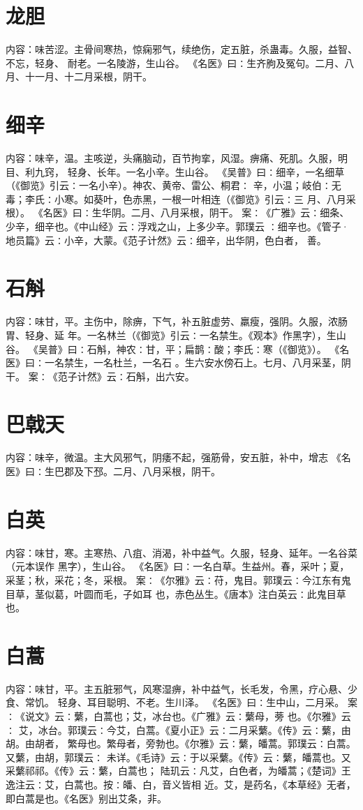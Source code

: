 \documentclass[12pt,UTF8]{ctexbook}
\begin{document}
\section{龙胆}
内容：味苦涩。主骨间寒热，惊痫邪气，续绝伤，定五脏，杀蛊毒。久服，益智、不忘，轻身、 
耐老。一名陵游，生山谷。 
《名医》曰∶生齐朐及冤句。二月、八月、十一月、十二月采根，阴干。 


\section{细辛}
内容：味辛，温。主咳逆，头痛脑动，百节拘挛，风湿。痹痛、死肌。久服，明目、利九窍， 
轻身、长年。一名小辛。生山谷。 
《吴普》曰∶细辛，一名细草（《御览》引云∶一名小辛）。神农、黄帝、雷公、桐君∶ 
辛，小温；岐伯∶无毒；李氏∶小寒。如葵叶，色赤黑，一根一叶相连（《御览》引云∶三 
月、八月采根）。 
《名医》曰∶生华阴。二月、八月采根，阴干。 
案∶《广雅》云∶细条、少辛，细辛也。《中山经》云∶浮戏之山，上多少辛。郭璞云 
∶细辛也。《管子·地员篇》云∶小辛，大蒙。《范子计然》云∶细辛，出华阴，色白者， 
善。 


\section{石斛}
内容：味甘，平。主伤中，除痹，下气，补五脏虚劳、羸瘦，强阴。久服，浓肠胃、轻身、延 
年。一名林兰（《御览》引云∶一名禁生。《观本》作黑字），生山谷。 
《吴普》曰∶石斛，神农∶甘，平；扁鹊∶酸；李氏∶寒（《御览》）。 
《名医》曰∶一名禁生，一名杜兰，一名石 。生六安水傍石上。七月、八月采茎，阴 
干。 
案∶《范子计然》云∶石斛，出六安。 


\section{巴戟天}
内容：味辛，微温。主大风邪气，阴痿不起，强筋骨，安五脏，补中，增志 
《名医》曰∶生巴郡及下邳。二月、八月采根，阴干。 


\section{白英}
内容：味甘，寒。主寒热、八疽、消渴，补中益气。久服，轻身、延年。一名谷菜（元本误作 
黑字），生山谷。 
《名医》曰∶一名白草。生益州。春，采叶；夏，采茎；秋，采花；冬，采根。 
案∶《尔雅》云∶苻，鬼目。郭璞云∶今江东有鬼目草，茎似葛，叶圆而毛，子如耳 
也，赤色丛生。《唐本》注白英云∶此鬼目草也。 


\section{白蒿}
内容：味甘，平。主五脏邪气，风寒湿痹，补中益气，长毛发，令黑，疗心悬、少食、常饥。 
轻身、耳目聪明、不老。生川泽。 
《名医》曰∶生中山，二月采。 
案∶《说文》云∶蘩，白蒿也；艾，冰台也。《广雅》云∶蘩母，蒡 也。《尔雅》云∶ 
艾，冰台。郭璞云∶今艾，白蒿。《夏小正》云∶二月采蘩。《传》云∶蘩，由胡。由胡者， 
繁母也。繁母者，旁勃也。《尔雅》云∶蘩，皤蒿。郭璞云∶白蒿。又蘩，由胡，郭璞云∶ 
未详。《毛诗》云∶于以采蘩。《传》云∶蘩，皤蒿也。又采蘩祁祁。《传》云∶蘩，白蒿也； 
陆玑云∶凡艾，白色者，为皤蒿；《楚词》王逸注云∶艾，白蒿也。按∶皤、白，音义皆相 
近。艾，是药名，《本草经》无者，即白蒿是也。《名医》别出艾条，非。 
\end{document}
